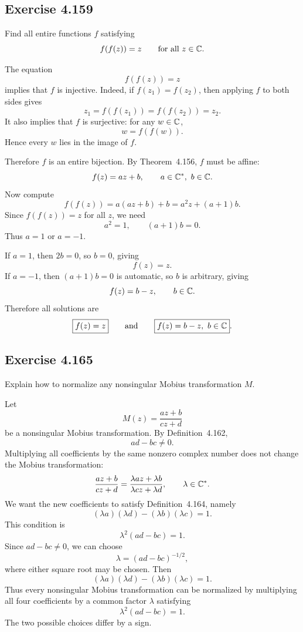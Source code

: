 \documentclass{article}
\begin{document}
\subsection{Exercise 4.159}

Find all entire functions $f$ satisfying
\[
  f(f(z))=z
  \qquad \text{for all }z\in\mathbb{C}.
\]

\begin{solution}
  The equation
  \[
    f(f(z))=z
  \]
  implies that $f$ is injective. Indeed, if $f(z_1)=f(z_2)$, then applying $f$
  to both sides gives
  \[
    z_1=f(f(z_1))=f(f(z_2))=z_2.
  \]
  It also implies that $f$ is surjective: for any $w\in\mathbb{C}$,
  \[
    w=f(f(w)).
  \]
  Hence every $w$ lies in the image of $f$.

  Therefore $f$ is an entire bijection. By Theorem~4.156, $f$ must be affine:
  \[
    f(z)=az+b,
    \qquad a\in\mathbb{C}^\ast,\ b\in\mathbb{C}.
  \]
  Now compute
  \[
    f(f(z))=a(az+b)+b=a^2z+(a+1)b.
  \]
  Since $f(f(z))=z$ for all $z$, we need
  \[
    a^2=1,
    \qquad
    (a+1)b=0.
  \]
  Thus $a=1$ or $a=-1$.

  If $a=1$, then $2b=0$, so $b=0$, giving
  \[
    f(z)=z.
  \]
  If $a=-1$, then $(a+1)b=0$ is automatic, so $b$ is arbitrary, giving
  \[
    f(z)=b-z,
    \qquad b\in\mathbb{C}.
  \]
  Therefore all solutions are
  \[
    \boxed{f(z)=z}
    \qquad\text{and}\qquad
    \boxed{f(z)=b-z,\ b\in\mathbb{C}}.
  \]
\end{solution}

\subsection{Exercise 4.165}

Explain how to normalize any nonsingular Mobius transformation $M$.

\begin{solution}
  Let
  \[
    M(z)=\frac{az+b}{cz+d}
  \]
  be a nonsingular Mobius transformation. By Definition~4.162,
  \[
    ad-bc\ne0.
  \]
  Multiplying all coefficients by the same nonzero complex number does not
  change the Mobius transformation:
  \[
    \frac{az+b}{cz+d}
    =
    \frac{\lambda az+\lambda b}{\lambda cz+\lambda d},
    \qquad \lambda\in\mathbb{C}^\ast.
  \]
  We want the new coefficients to satisfy Definition~4.164, namely
  \[
    (\lambda a)(\lambda d)-(\lambda b)(\lambda c)=1.
  \]
  This condition is
  \[
    \lambda^2(ad-bc)=1.
  \]
  Since $ad-bc\ne0$, we can choose
  \[
    \lambda=(ad-bc)^{-1/2},
  \]
  where either square root may be chosen. Then
  \[
    (\lambda a)(\lambda d)-(\lambda b)(\lambda c)=1.
  \]
  Thus every nonsingular Mobius transformation can be normalized by multiplying
  all four coefficients by a common factor $\lambda$ satisfying
  \[
    \lambda^2(ad-bc)=1.
  \]
  The two possible choices differ by a sign.
\end{solution}
\end{document}
